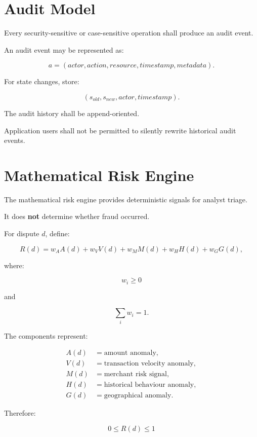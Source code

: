 \documentclass[11pt,a4paper]{article}
\begin{document}
\section{Audit Model}

Every security-sensitive or case-sensitive operation shall produce an
audit event.

An audit event may be represented as:

\[
a =
(
actor,
action,
resource,
timestamp,
metadata
).
\]

For state changes, store:

\[
(s_{old},s_{new},actor,timestamp).
\]

The audit history shall be append-oriented.

Application users shall not be permitted to silently rewrite historical
audit events.

\section{Mathematical Risk Engine}

The mathematical risk engine provides deterministic signals for analyst
triage.

It does \textbf{not} determine whether fraud occurred.

For dispute \(d\), define:

\[
R(d)
=
w_A A(d)
+
w_V V(d)
+
w_M M(d)
+
w_H H(d)
+
w_G G(d),
\]

where:

\[
w_i\geq0
\]

and

\[
\sum_i w_i=1.
\]

The components represent:

\begin{align*}
A(d) &= \text{amount anomaly},\\
V(d) &= \text{transaction velocity anomaly},\\
M(d) &= \text{merchant risk signal},\\
H(d) &= \text{historical behaviour anomaly},\\
G(d) &= \text{geographical anomaly}.
\end{align*}

Therefore:

\[
0\leq R(d)\leq1
\]
\end{document}
